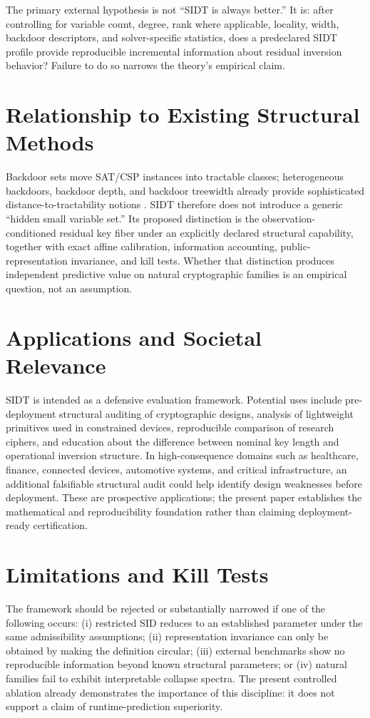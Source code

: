 \documentclass[11pt]{article}
\begin{document}
The primary external hypothesis is not ``SIDT is always better.'' It is: after controlling for variable count, degree, rank where applicable, locality, width, backdoor descriptors, and solver-specific statistics, does a predeclared SIDT profile provide reproducible incremental information about residual inversion behavior? Failure to do so narrows the theory's empirical claim.

\section{Relationship to Existing Structural Methods}
Backdoor sets move SAT/CSP instances into tractable classes; heterogeneous backdoors, backdoor depth, and backdoor treewidth already provide sophisticated distance-to-tractability notions \parencite{gaspers2017csp,gaspers2017hetero,dreier2024,gasper2026}. SIDT therefore does not introduce a generic ``hidden small variable set.'' Its proposed distinction is the observation-conditioned residual key fiber under an explicitly declared structural capability, together with exact affine calibration, information accounting, public-representation invariance, and kill tests. Whether that distinction produces independent predictive value on natural cryptographic families is an empirical question, not an assumption.

\section{Applications and Societal Relevance}
SIDT is intended as a defensive evaluation framework. Potential uses include pre-deployment structural auditing of cryptographic designs, analysis of lightweight primitives used in constrained devices, reproducible comparison of research ciphers, and education about the difference between nominal key length and operational inversion structure. In high-consequence domains such as healthcare, finance, connected devices, automotive systems, and critical infrastructure, an additional falsifiable structural audit could help identify design weaknesses before deployment. These are prospective applications; the present paper establishes the mathematical and reproducibility foundation rather than claiming deployment-ready certification.

\section{Limitations and Kill Tests}
The framework should be rejected or substantially narrowed if one of the following occurs: (i) restricted SID reduces to an established parameter under the same admissibility assumptions; (ii) representation invariance can only be obtained by making the definition circular; (iii) external benchmarks show no reproducible information beyond known structural parameters; or (iv) natural families fail to exhibit interpretable collapse spectra. The present controlled ablation already demonstrates the importance of this discipline: it does not support a claim of runtime-prediction superiority.
\end{document}
